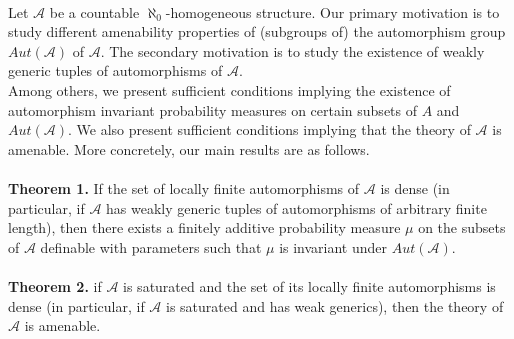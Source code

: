 \documentclass[bsl,meeting]{asl}
\newcommand{\NP}{}
\begin{document}
\thispagestyle{empty}


\NP {} 

\ \\
\indent Let ${\mathcal A}$ be a countable $\aleph_{0}$-homogeneous
structure. Our primary motivation is to study different
amenability properties of (subgroups of) the automorphism group
$\mathit{Aut}({\mathcal A})$ of ${\mathcal A}$. The secondary
motivation is to study the existence of weakly generic
tuples of automorphisms of ${\mathcal A}$.\\
\indent Among others, we present sufficient conditions implying
the existence of automorphism invariant probability measures on
certain subsets of $A$ and $\mathit{Aut}({\mathcal A})$. We also
present sufficient conditions implying that the theory of
${\mathcal A}$ is
amenable. More concretely, our main results are as follows. \\
\\
{\bf Theorem 1.} If the set of locally finite automorphisms of
${\mathcal A}$ is dense (in particular, if ${\mathcal A}$ has
weakly generic tuples of automorphisms of arbitrary finite
length), then there exists a finitely additive probability
measure $\mu$ on the subsets of ${\mathcal A}$ definable with
parameters such that $\mu$ is invariant
under $\mathit{Aut}({\mathcal A})$.  \\
\\
{\bf Theorem 2.} if ${\mathcal A}$ is saturated and the set of its
locally finite automorphisms is dense (in particular, if
${\mathcal A}$ is saturated and has weak generics), then the
theory of ${\mathcal A}$ is amenable.









\vspace*{-0.5\baselineskip}
\end{document}
